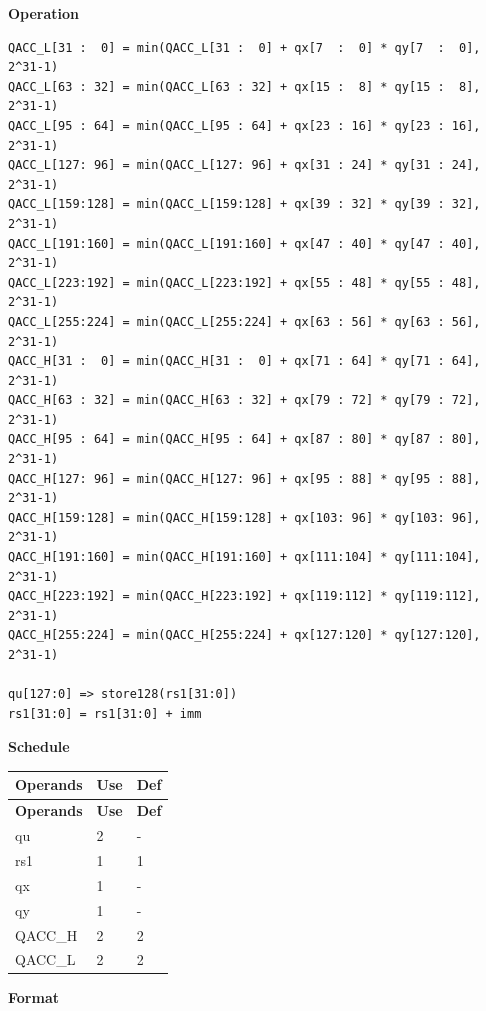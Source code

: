 \textbf{Operation}\\

\begin{lstlisting}
QACC_L[31 :  0] = min(QACC_L[31 :  0] + qx[7  :  0] * qy[7  :  0], 2^31-1)
QACC_L[63 : 32] = min(QACC_L[63 : 32] + qx[15 :  8] * qy[15 :  8], 2^31-1)
QACC_L[95 : 64] = min(QACC_L[95 : 64] + qx[23 : 16] * qy[23 : 16], 2^31-1)
QACC_L[127: 96] = min(QACC_L[127: 96] + qx[31 : 24] * qy[31 : 24], 2^31-1)
QACC_L[159:128] = min(QACC_L[159:128] + qx[39 : 32] * qy[39 : 32], 2^31-1)
QACC_L[191:160] = min(QACC_L[191:160] + qx[47 : 40] * qy[47 : 40], 2^31-1)
QACC_L[223:192] = min(QACC_L[223:192] + qx[55 : 48] * qy[55 : 48], 2^31-1)
QACC_L[255:224] = min(QACC_L[255:224] + qx[63 : 56] * qy[63 : 56], 2^31-1)
QACC_H[31 :  0] = min(QACC_H[31 :  0] + qx[71 : 64] * qy[71 : 64], 2^31-1)
QACC_H[63 : 32] = min(QACC_H[63 : 32] + qx[79 : 72] * qy[79 : 72], 2^31-1)
QACC_H[95 : 64] = min(QACC_H[95 : 64] + qx[87 : 80] * qy[87 : 80], 2^31-1)
QACC_H[127: 96] = min(QACC_H[127: 96] + qx[95 : 88] * qy[95 : 88], 2^31-1)
QACC_H[159:128] = min(QACC_H[159:128] + qx[103: 96] * qy[103: 96], 2^31-1)
QACC_H[191:160] = min(QACC_H[191:160] + qx[111:104] * qy[111:104], 2^31-1)
QACC_H[223:192] = min(QACC_H[223:192] + qx[119:112] * qy[119:112], 2^31-1)
QACC_H[255:224] = min(QACC_H[255:224] + qx[127:120] * qy[127:120], 2^31-1)

qu[127:0] => store128(rs1[31:0])
rs1[31:0] = rs1[31:0] + imm
\end{lstlisting}

\textbf{Schedule}\\
\begin{longtable}[c]{|l|l|l|}
    \hline
    \rowcolor{lightgray}
    \textbf{Operands} & \textbf{Use} & \textbf{Def} \\\hline
    \endfirsthead
    \hline
    \rowcolor{lightgray}
     \textbf{Operands} & \textbf{Use} & \textbf{Def} \\\hline
    \endhead
    \hline
    \endfoot

    qu & 2 & - \\\hline
    rs1 & 1 & 1 \\\hline
     qx & 1 & - \\\hline
     qy & 1 & - \\\hline
     QACC\_H & 2 & 2 \\\hline
     QACC\_L & 2 & 2

\end{longtable}

\textbf{Format}\\

